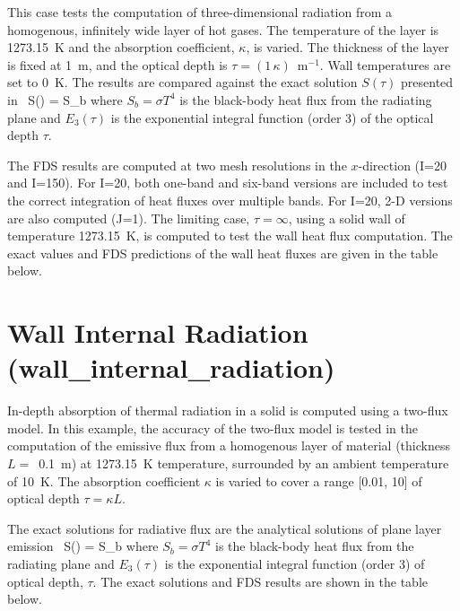 \documentclass[11pt]{book}
\begin{document}
This case tests the computation of three-dimensional radiation from a homogenous, infinitely wide layer of hot gases.  The temperature of
the layer is 1273.15~K and the absorption coefficient, $\kappa$, is varied. The thickness of the layer is fixed at 1~m, and the optical depth is $\tau = (1 \, \kappa)$~m$^{-1}$.
Wall temperatures are set to 0~K. The results are compared against the exact solution $S(\tau)$ presented in~\cite{Zeldovich:1}
\be S(\tau) = S_b \ee
where $S_b = \sigma T^4$ is the black-body heat flux from the radiating plane and $E_3(\tau)$ is the exponential
integral function (order 3) of the optical depth $\tau$.

The FDS results are computed at two mesh resolutions in the $x$-direction (I=20 and I=150). For I=20, both one-band and six-band versions are
included to test the correct integration of heat fluxes over multiple bands. For I=20, 2-D versions are also computed (J=1). The limiting case, $\tau=\infty$,
using a solid wall of temperature 1273.15~K, is computed to test the wall heat flux computation. The exact values and FDS predictions of
the wall heat fluxes are given in the table below.




\clearpage
\section{Wall Internal Radiation (\texorpdfstring{{\bf wall\_internal\_radiation}}{wall\_internal\_radiation}) }
\label{wall_internal_radiation}


In-depth absorption of thermal radiation in a solid is computed using a two-flux model.  In this example, the accuracy of the two-flux model
is tested in the computation of the emissive flux from a homogenous layer of material (thickness $L=$~0.1~m) at 1273.15~K temperature,
surrounded by an ambient temperature of 10~K. The absorption coefficient $\kappa$ is varied to cover a range [0.01, 10] of optical depth
$\tau = \kappa L$.

The exact solutions for radiative flux are the analytical solutions of plane layer emission~\cite{Zeldovich:1}
\be S(\tau) = S_b \ee
where $S_b = \sigma T^4$ is the black-body heat flux from the radiating plane and $E_3(\tau)$ is the exponential
integral function (order 3) of optical depth, $\tau$. The exact solutions and FDS results are shown in the table below.


\end{document}
